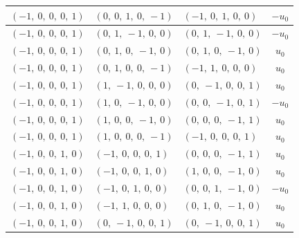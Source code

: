 \documentclass[11pt]{article}
\theoremstyle{definition}
\begin{document}
\begin{longtable}{|l|l|l|c|}
    \hline
    $\left( -1, \  0, \  0, \  0, \  1\right)$ & $\left( 0, \  0, \  1, \  0, \  -1\right)$ & $\left( -1, \  0, \  1, \  0, \  0\right)$ & $- u_{0}$ \\
    \hline
    $\left( -1, \  0, \  0, \  0, \  1\right)$ & $\left( 0, \  1, \  -1, \  0, \  0\right)$ & $\left( 0, \  1, \  -1, \  0, \  0\right)$ & $- u_{0}$ \\
    \hline
    $\left( -1, \  0, \  0, \  0, \  1\right)$ & $\left( 0, \  1, \  0, \  -1, \  0\right)$ & $\left( 0, \  1, \  0, \  -1, \  0\right)$ & $u_{0}$ \\
    \hline
    $\left( -1, \  0, \  0, \  0, \  1\right)$ & $\left( 0, \  1, \  0, \  0, \  -1\right)$ & $\left( -1, \  1, \  0, \  0, \  0\right)$ & $u_{0}$ \\
    \hline
    $\left( -1, \  0, \  0, \  0, \  1\right)$ & $\left( 1, \  -1, \  0, \  0, \  0\right)$ & $\left( 0, \  -1, \  0, \  0, \  1\right)$ & $u_{0}$ \\
    \hline
    $\left( -1, \  0, \  0, \  0, \  1\right)$ & $\left( 1, \  0, \  -1, \  0, \  0\right)$ & $\left( 0, \  0, \  -1, \  0, \  1\right)$ & $- u_{0}$ \\
    \hline
    $\left( -1, \  0, \  0, \  0, \  1\right)$ & $\left( 1, \  0, \  0, \  -1, \  0\right)$ & $\left( 0, \  0, \  0, \  -1, \  1\right)$ & $u_{0}$ \\
    \hline
    $\left( -1, \  0, \  0, \  0, \  1\right)$ & $\left( 1, \  0, \  0, \  0, \  -1\right)$ & $\left( -1, \  0, \  0, \  0, \  1\right)$ & $u_{0}$ \\
    \hline
    $\left( -1, \  0, \  0, \  1, \  0\right)$ & $\left( -1, \  0, \  0, \  0, \  1\right)$ & $\left( 0, \  0, \  0, \  -1, \  1\right)$ & $u_{0}$ \\
    \hline
    $\left( -1, \  0, \  0, \  1, \  0\right)$ & $\left( -1, \  0, \  0, \  1, \  0\right)$ & $\left( 1, \  0, \  0, \  -1, \  0\right)$ & $u_{0}$ \\
    \hline
    $\left( -1, \  0, \  0, \  1, \  0\right)$ & $\left( -1, \  0, \  1, \  0, \  0\right)$ & $\left( 0, \  0, \  1, \  -1, \  0\right)$ & $- u_{0}$ \\
    \hline
    $\left( -1, \  0, \  0, \  1, \  0\right)$ & $\left( -1, \  1, \  0, \  0, \  0\right)$ & $\left( 0, \  1, \  0, \  -1, \  0\right)$ & $u_{0}$ \\
    \hline
    $\left( -1, \  0, \  0, \  1, \  0\right)$ & $\left( 0, \  -1, \  0, \  0, \  1\right)$ & $\left( 0, \  -1, \  0, \  0, \  1\right)$ & $u_{0}$ \\

\end{longtable}
\end{document}
